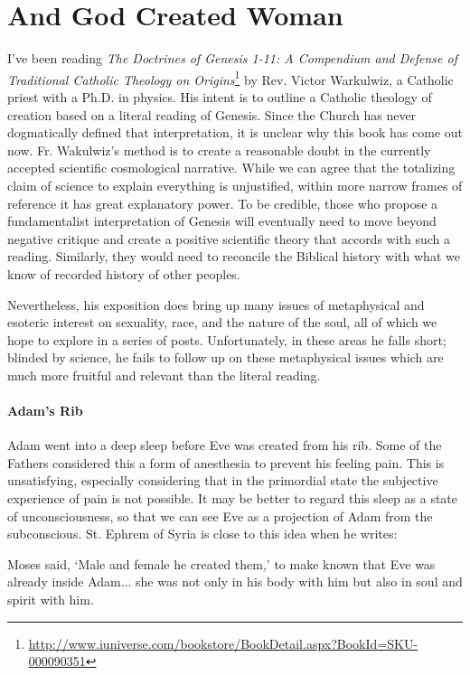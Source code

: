 \section{And God Created Woman}

I've been reading \textit{The Doctrines of Genesis 1-11: A Compendium and Defense of Traditional Catholic Theology on Origins}\footnote{\url{http://www.iuniverse.com/bookstore/BookDetail.aspx?BookId=SKU-000090351}} by Rev. Victor Warkulwiz, a Catholic priest with a Ph.D. in physics. His intent is to outline a Catholic theology of creation based on a literal reading of Genesis. Since the Church has never dogmatically defined that interpretation, it is unclear why this book has come out now. Fr. Wakulwiz's method is to create a reasonable doubt in the currently accepted scientific cosmological narrative. While we can agree that the totalizing claim of science to explain everything is unjustified, within more narrow frames of reference it has great explanatory power. To be credible, those who propose a fundamentalist interpretation of Genesis will eventually need to move beyond negative critique and create a positive scientific theory that accords with such a reading. Similarly, they would need to reconcile the Biblical history with what we know of recorded history of other peoples.

Nevertheless, his exposition does bring up many issues of metaphysical and esoteric interest on sexuality, race, and the nature of the soul, all of which we hope to explore in a series of posts. Unfortunately, in these areas he falls short; blinded by science, he fails to follow up on these metaphysical issues which are much more fruitful and relevant than the literal reading.

\paragraph{Adam's Rib}

Adam went into a deep sleep before Eve was created from his rib. Some of the Fathers considered this a form of anesthesia to prevent his feeling pain. This is unsatisfying, especially considering that in the primordial state the subjective experience of pain is not possible. It may be better to regard this sleep as a state of unconsciousness, so that we can see Eve as a projection of Adam from the subconscious. St. Ephrem of Syria is close to this idea when he writes:

\begin{quotex}
Moses said, `Male and female he created them,' to make known that Eve was already inside Adam... she was not only in his body with him but also in soul and spirit with him.
\end{quotex}


